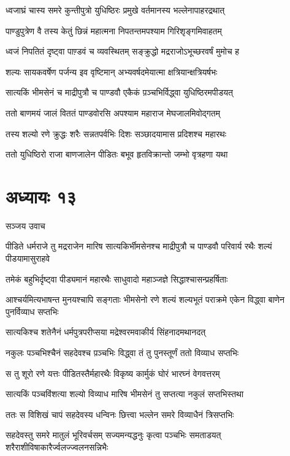 \twolineshloka
{ध्वजाघ्रं चास्य समरे कुन्तीपुत्रो युधिष्ठिरः}
{प्रमुखे वर्तमानस्य भल्लेनापाहरद्रथात्}


\twolineshloka
{पाण्डुपुत्रेण वै तस्य केतुं छिन्नं महात्मना}
{निपतन्तमपश्याम गिरिशृङ्गमिवाहतम्}


\twolineshloka
{ध्वजं निपतितं दृष्ट्वा पाण़्डवं च व्यवस्थितम्}
{सङ्क्रुद्धो मद्रराजोऽभूच्छरवर्षं मुमोच ह}


\twolineshloka
{शल्यः सायकवर्षेण पर्जन्य इव वृष्टिमान्}
{अभ्यवर्षदमेयात्मा क्षत्रियान्क्षत्रियर्षभः}


\twolineshloka
{सात्यकिं भीमसेनं च माद्रीपुत्रौ च पाण्डवौ}
{एकैकं प़ञ्चभिर्विद्ध्वा युधिष्ठिरमपीडयत्}


\twolineshloka
{ततो बाणमयं जालं विततं पाण्डवोरसि}
{अपश्याम महाराज मेघजालमिवोद्गतम्}


\twolineshloka
{तस्य शल्यो रणे क्रुद्धः शरैः सन्नतपर्वभिः}
{दिशः सञ्छादयामास प्रदिशश्च महारथः}


\twolineshloka
{ततो युधिष्ठिरो राजा बाणजालेन पीडितः}
{बभूव हृतविक्रान्तो जम्भो वृत्रहणा यथा}


\chapter{अध्यायः १३}
\twolineshloka
{सञ्जय उवाच}
{}


\threelineshloka
{पीडिते धर्मराजे तु मद्रराजेन मारिष}
{सात्यकिर्भीमसेनश्च माद्रीपुत्रौ च पाण्डवौ}
{परिवार्य रथैः शल्यं पीडयामासुराहवे}


\twolineshloka
{तमेकं बहुभिर्दृष्ट्वा पीड्यमानं महारथैः}
{साधुवादो महाञ्जज्ञे सिद्धाश्चासन्प्रहर्षिताः}


आश्चर्यमित्यभाषन्त मुनयश्चापि सङ्गताः
\twolineshloka
{भीमसेनो रणे शल्यं शल्यभूतं पराक्रमे}
{एकेन विद्ध्वा बाणेन पुनर्विव्याध सप्तभिः}


\twolineshloka
{सात्यकिश्च शतेनैनं धर्मपुत्रपरीप्सया}
{मद्रेश्वरमवाकीर्य सिंहनादमथानदत्}


\twolineshloka
{नकुलः पञ्चभिश्चैनं सहदेवश्च प़ञ्चभिः}
{विद्ध्वा तं तु पुनस्तूर्णं ततो विव्याध सप्तभिः}


\twolineshloka
{स तु शूरो रणे यत्तः पीडितस्तैर्महारथैः}
{विकृष्य कार्मुकं घोरं भारघ्नं वेगवत्तरम्}


\twolineshloka
{सात्यकिं पञ्चविंशत्या शल्यो विव्याध मारिष}
{भीमसेनं तु सप्तत्या नकुलं सप्तभिस्तथा}


\twolineshloka
{ततः स विशिखं चापं सहदेवस्य धन्विनः}
{छित्त्वा भल्लेन समरे विव्याधैनं त्रिसप्तभिः}


\threelineshloka
{सहदेवस्तु समरे मातुलं भूरिवर्चसम्}
{सज्यमन्यद्धनुः कृत्वा पञ्चभिः समताडयत्}
{शरैराशीविषाकारैर्ज्वलज्ज्वलनसन्निभैः}


